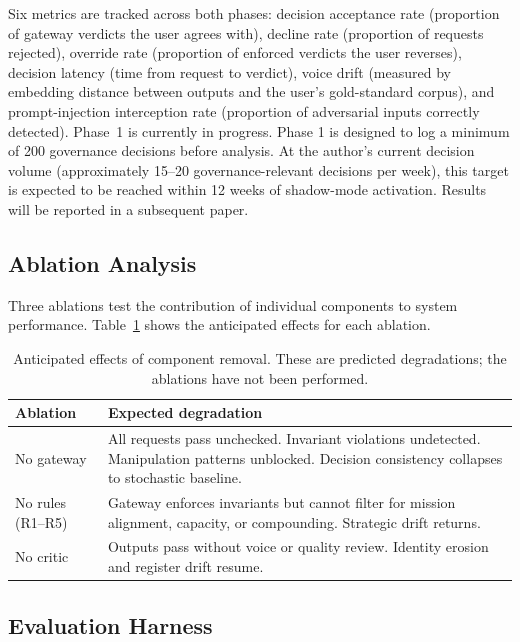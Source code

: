 \documentclass[11pt,a4paper]{article}
\begin{document}
Six metrics are tracked across both phases: decision acceptance rate (proportion of gateway verdicts the user agrees with), decline rate (proportion of requests rejected), override rate (proportion of enforced verdicts the user reverses), decision latency (time from request to verdict), voice drift (measured by embedding distance between outputs and the user's gold-standard corpus), and prompt-injection interception rate (proportion of adversarial inputs correctly detected). Phase~1 is currently in progress. Phase 1 is designed to log a minimum of 200 governance decisions before analysis. At the author's current decision volume (approximately 15--20 governance-relevant decisions per week), this target is expected to be reached within 12 weeks of shadow-mode activation. Results will be reported in a subsequent paper.

\subsection{Ablation Analysis}

Three ablations test the contribution of individual components to system performance. Table~\ref{tab:ablation} shows the anticipated effects for each ablation.

\begin{table}[H]
\centering
\caption{Anticipated effects of component removal. These are predicted degradations; the ablations have not been performed.}
\label{tab:ablation}
\begin{tabular}{@{}lp{8cm}@{}}
\toprule
\textbf{Ablation} & \textbf{Expected degradation} \\
\midrule
No gateway       & All requests pass unchecked. Invariant violations undetected. Manipulation patterns unblocked. Decision consistency collapses to stochastic baseline. \\
No rules (R1--R5) & Gateway enforces invariants but cannot filter for mission alignment, capacity, or compounding. Strategic drift returns. \\
No critic         & Outputs pass without voice or quality review. Identity erosion and register drift resume. \\
\bottomrule
\end{tabular}
\end{table}

\subsection{Evaluation Harness}
\end{document}
